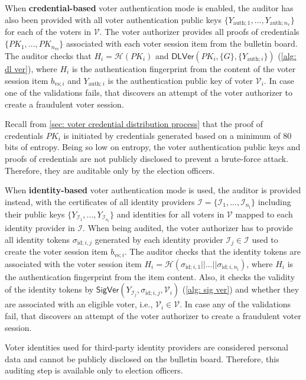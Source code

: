 When \textbf{credential-based} voter authentication mode is enabled, the auditor has also been provided with all voter authentication public keys $\{ Y_{\mathrm{auth}; 1}, ..., Y_{\mathrm{auth}; n_\mathrm{v}} \}$ for each of the voters in $\boldsymbol{\mathcal{V}}$. The voter authorizer provides all proofs of credentials $\{ PK_1, ..., PK_{n_\mathrm{vs}} \}$ associated with each voter session item from the bulletin board. The auditor checks that $H_i = \mathcal{H} (PK_i)$ and $\mathsf{DLVer} (PK_i, \{ G \}, \{ Y_{\mathrm{auth}; i} \})$ (\cref{alg: dl ver}), where $H_i$ is the authentication fingerprint from the content of the voter session item $b_{\mathrm{vs}; i}$ and $Y_{\mathrm{auth}; i}$ is the authentication public key of voter $\mathcal{V}_i$. In case one of the validations fails, that discovers an attempt of the voter authorizer to create a fraudulent voter session.

Recall from \cref{sec: voter credential distribution process} that the proof of credentials $PK_i$ is initiated by credentials generated based on a minimum of 80 bits of entropy. Being so low on entropy, the voter authentication public keys and proofs of credentials are not publicly disclosed to prevent a brute-force attack. Therefore, they are auditable only by the election officers.

When \textbf{identity-based} voter authentication mode is used, the auditor is provided instead, with the certificates of all identity providers $\boldsymbol{\mathcal{I}} = \{ \mathcal{I}_1, ..., \mathcal{I}_{n_\mathrm{i}} \}$ including their public keys $\{ Y_{\mathcal{I}_1}, ..., Y_{\mathcal{I}_{n_\mathrm{i}}} \}$ and identities for all voters in $\boldsymbol{\mathcal{V}}$ mapped to each identity provider in $\boldsymbol{\mathcal{I}}$. When being audited, the voter authorizer has to provide all identity tokens $\sigma_{\mathrm{id}; i, j}$ generated by each identity provider $\mathcal{I}_j \in \boldsymbol{\mathcal{I}}$ used to create the voter session item $b_{\mathrm{vs}; i}$. The auditor checks that the identity tokens are associated with the voter session item $H_i = \mathcal{H} (\sigma_{\mathrm{id}; i, 1} || ... || \sigma_{\mathrm{id}; i, n_{\mathrm{i}}})$, where $H_i$ is the authentication fingerprint from the item content. Also, it checks the validity of the identity tokens by $\mathsf{SigVer} (Y_{\mathcal{I}_j}, \sigma_{\mathrm{id}; i, j}, \mathcal{V}_i)$ (\cref{alg: sig ver}) and whether they are associated with an eligible voter, i.e., $\mathcal{V}_i \in \boldsymbol{\mathcal{V}}$. In case any of the validations fail, that discovers an attempt of the voter authorizer to create a fraudulent voter session.

Voter identities used for third-party identity providers are considered personal data and cannot be publicly disclosed on the bulletin board. Therefore, this auditing step is available only to election officers.
